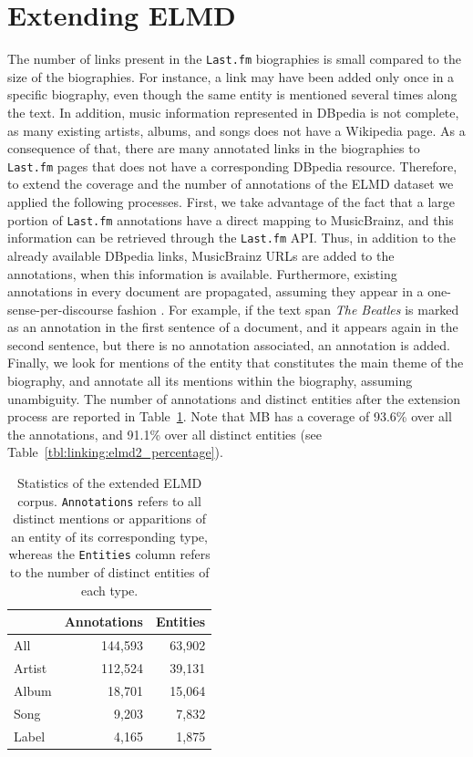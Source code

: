 \section{Extending ELMD}
\label{sec:linking:extending}

The number of links present in the \texttt{Last.fm} biographies is small compared to the size of the biographies. For instance, a link may have been added only once in a specific biography, even though the same entity is mentioned several times along the text. 
In addition, music information represented in DBpedia is not complete, as many existing artists, albums, and songs does not have a Wikipedia page. As a consequence of that, there are many annotated links in the biographies to \texttt{Last.fm} pages that does not have a corresponding DBpedia resource.
Therefore, to extend the coverage and the number of annotations of the \textsc{ELMD} dataset we applied the following processes. First, we take advantage of the fact that a large portion of \texttt{Last.fm} annotations have a direct mapping to MusicBrainz, and this information can be retrieved through the \texttt{Last.fm} API. Thus, in addition to the already available DBpedia links, MusicBrainz URLs are added to the annotations, when this information is available. Furthermore, existing annotations in every document are propagated, assuming they appear in a one-sense-per-discourse fashion \citep{gale1992one}. For example, if the text span \textit{The Beatles} is marked as an annotation in the first sentence of a document, and it appears again in the second sentence, but there is no annotation associated, an annotation is added. Finally, we look for mentions of the entity that constitutes the main theme of the biography, and annotate all its mentions within the biography, assuming unambiguity. The number of annotations and distinct entities after the extension process are reported in Table~\ref{tbl:linking:elmd2}. Note that MB has a coverage of 93.6\% over all the annotations, and 91.1\% over all distinct entities (see Table~\ref{tbl:linking:elmd2_percentage}).

\begin{table}[]
\centering
\begin{tabular}{ l r r }
\hline
& \textbf{Annotations} & \textbf{Entities} \\ \hline
All    & 144,593      & 63,902    \\ 
Artist & 112,524      & 39,131    \\ 
Album  & 18,701       & 15,064    \\ 
Song  & 9,203        & 7,832     \\ 
Label  & 4,165        & 1,875    
\\ \hline
\end{tabular}
\caption[Statistics of the extended ELMD corpus.]{Statistics of the extended ELMD corpus. \texttt{Annotations} refers to all distinct mentions or apparitions of an entity of its corresponding type, whereas the \texttt{Entities} column refers to the number of distinct entities of each type.}
\label{tbl:linking:elmd2}
\end{table}

